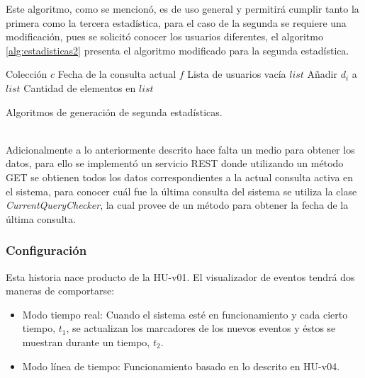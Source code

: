 Este algoritmo, como se mencionó, es de uso general y permitirá cumplir tanto la primera como la tercera estadística, para el caso de la segunda se requiere una modificación, pues se solicitó conocer los usuarios diferentes, el algoritmo \ref{alg:estadisticas2} presenta el algoritmo modificado para la segunda estadística.\\

\begin{algorithm}[H]
	\begin{algorithmic}
		\REQUIRE Colección $c$ 
		\REQUIRE Fecha de la consulta actual $f$ 
		\ENSURE Lista de usuarios vacía $list$  
					\STATE Añadir $d_{i}$ a $list$
				\ENDIF
			\ENDIF	
		\ENDFOR
		\RETURN Cantidad de elementos en $list$
	\end{algorithmic}
	\caption{Algoritmos de generación de segunda estadísticas.}
	\label{alg:estadisticas2}
\end{algorithm}\vphantom\\

Adicionalmente a lo anteriormente descrito hace falta un medio para obtener los datos, para ello se implementó un servicio REST donde utilizando un método GET se obtienen todos los datos correspondientes a la actual consulta activa en el sistema, para conocer cuál fue la última consulta del sistema se utiliza la clase \textit{CurrentQueryChecker}, la cual provee de un método para obtener la fecha de la última consulta.

\subsubsection*{Configuración}
\label{subsubsec:config}

Esta historia nace producto de la HU-v01. El visualizador de eventos tendrá dos maneras de comportarse:

\begin{itemize}
\item Modo tiempo real: Cuando el sistema esté en funcionamiento y cada cierto tiempo, $t_{1}$, se actualizan los marcadores de los nuevos eventos y éstos se muestran durante un tiempo, $t_{2}$.
\item Modo línea de tiempo: Funcionamiento basado en lo descrito en HU-v04.
\end{itemize}

